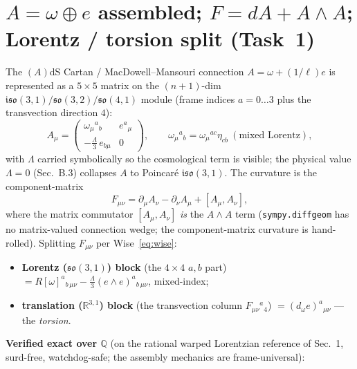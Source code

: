 \documentclass[11pt]{article}
\newcommand{\R}{\mathbb{R}}
\newcommand{\Q}{\mathbb{Q}}
\newcommand{\eu}{e}
\newcommand{\om}{\omega}
\theoremstyle{definition}\newtheorem{remark}{Remark}
\theoremstyle{plain}\newtheorem{proposition}{Proposition}
\begin{document}
\section{$A=\om\oplus \eu$ assembled; $F=dA+A\wedge A$; Lorentz / torsion split (Task~1)}
The $(A)$dS Cartan / MacDowell--Mansouri connection $A=\om+(1/\ell)\eu$ is represented as a
$5\times5$ matrix on the $(n{+}1)$-dim $\mathfrak{iso}(3,1)/\mathfrak{so}(3,2)/\mathfrak{so}(4,1)$
module (frame indices $a=0\ldots3$ plus the transvection direction $4$):
\begin{equation}\label{eq:Amatrix}
  A_\mu=\begin{pmatrix} \om_\mu{}^a{}_b & \eu^a{}_\mu\\[2pt]
  -\tfrac{\Lambda}{3}\,\eu_{b\mu} & 0\end{pmatrix},
  \qquad \om_\mu{}^a{}_b=\om_\mu{}^{ac}\eta_{cb}\ (\text{mixed Lorentz}),
\end{equation}
with $\Lambda$ carried symbolically so the cosmological term is visible; the physical value
$\Lambda=0$ (Sec.~B.3) collapses $A$ to Poincar\'e $\mathfrak{iso}(3,1)$. The curvature is the
component-matrix
\begin{equation}\label{eq:Fcomm}
  F_{\mu\nu}=\partial_\mu A_\nu-\partial_\nu A_\mu+[A_\mu,A_\nu],
\end{equation}
where the matrix commutator $[A_\mu,A_\nu]$ \emph{is} the $A\wedge A$ term (\texttt{sympy.diffgeom}
has no matrix-valued connection wedge; the component-matrix curvature is hand-rolled). Splitting
$F_{\mu\nu}$ per Wise~\eqref{eq:wise}:
\begin{itemize}
\item \textbf{Lorentz ($\mathfrak{so}(3,1)$) block} (the $4\times4$ $a,b$ part)
  $=R[\om]^a{}_{b\,\mu\nu}-\tfrac{\Lambda}{3}(\eu\wedge \eu)^a{}_{b\,\mu\nu}$, mixed-index;
\item \textbf{translation ($\R^{3,1}$) block} (the transvection column $F_{\mu\nu}{}^a{}_4$)
  $=(d_\om \eu)^a{}_{\mu\nu}$ --- the \emph{torsion}.
\end{itemize}
\textbf{Verified exact over $\Q$} (on the rational warped Lorentzian reference of Sec.~1, surd-free,
watchdog-safe; the assembly mechanics are frame-universal):
\end{document}
